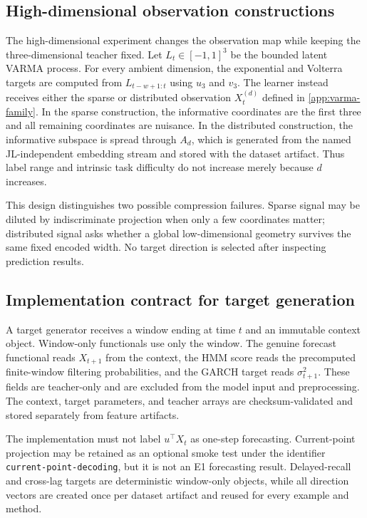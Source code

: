 \subsection{High-dimensional observation constructions}
\label{app:high-dimensional-functionals}

The high-dimensional experiment changes the observation map while keeping the
three-dimensional teacher fixed.  Let \(L_t\in[-1,1]^3\) be the bounded latent
VARMA process.  For every ambient dimension, the exponential and Volterra
targets are computed from \(L_{t-w+1:t}\) using \(u_3\) and \(v_3\).  The
learner instead receives either the sparse or distributed observation
\(X_t^{(d)}\) defined in \cref{app:varma-family}.  In the sparse construction,
the informative coordinates are the first three and all remaining coordinates
are nuisance.  In the distributed construction, the informative subspace is
spread through \(A_d\), which is generated from the named JL-independent
embedding stream and stored with the dataset artifact.  Thus label range and
intrinsic task difficulty do not increase merely because \(d\) increases.

This design distinguishes two possible compression failures.  Sparse signal
may be diluted by indiscriminate projection when only a few coordinates matter;
distributed signal asks whether a global low-dimensional geometry survives the
same fixed encoded width.  No target direction is selected after inspecting
prediction results.

\subsection{Implementation contract for target generation}
\label{app:functional-implementation}

A target generator receives a window ending at time \(t\) and an immutable
context object.  Window-only functionals use only the window.  The genuine
forecast functional reads \(X_{t+1}\) from the context, the HMM score reads the
precomputed finite-window filtering probabilities, and the GARCH target reads
\(\sigma_{t+1}^2\).  These fields are teacher-only and are excluded from the
model input and preprocessing.  The context, target parameters, and teacher
arrays are checksum-validated and stored separately from feature artifacts.

The implementation must not label \(u^\top X_t\) as one-step forecasting.
Current-point projection may be retained as an optional smoke test under the
identifier \texttt{current-point-decoding}, but it is not an E1 forecasting
result.  Delayed-recall and cross-lag targets are deterministic window-only
objects, while all direction vectors are created once per dataset artifact and
reused for every example and method.

